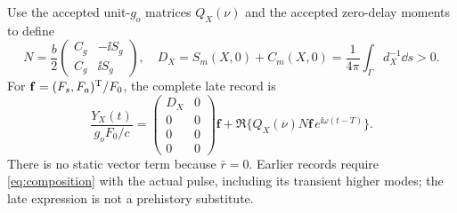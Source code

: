Use the accepted unit-$g_o$ matrices $Q_X(\nu)$ and the accepted zero-delay moments to define
\begin{equation}\label{eq:sourceN}
 N=\frac b2\begin{pmatrix}C_g&-\ii S_g\\C_g&\ii S_g\end{pmatrix},\quad
 D_X=S_m(X,0)+C_m(X,0)=\frac1{4\pi}\int_\Gamma d_X^{-1}\dd s>0.
\end{equation}
For $\mathbf f=(F_s,F_a)^{\mathrm T}/F_0$, the complete late record is
\begin{equation}\label{eq:laterecord}
 \frac{Y_X(t)}{g_oF_0/c}
 =\begin{pmatrix}D_X&0\\0&0\\0&0\\0&0\end{pmatrix}\mathbf f
 +\Re\{Q_X(\nu)N\mathbf f\,e^{\ii\omega(t-T)}\}.
\end{equation}
There is no static vector term because $\bar r=0$. Earlier records require \eqref{eq:composition} with the actual pulse, including its transient higher modes; the late expression is not a prehistory substitute.

